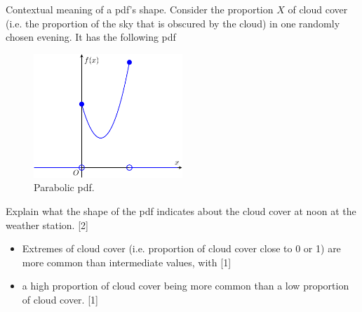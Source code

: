 \begin{example}{Contextual meaning of a pdf's shape.}{}
  Consider the proportion \(X\) of cloud cover (i.e. the proportion of the sky that is obscured by the cloud) in one randomly chosen evening. It has the following pdf
  \begin{figure}[H]
    \centering
    \includegraphics[width=0.5\textwidth]{../Diagrams/Parabolic-probability-density-function/parabolic-pdf.pdf}
    \caption{Parabolic pdf.}
    \label{fig:parabolic-pdf}
  \end{figure}
  Explain what the shape of the pdf indicates about the cloud cover at noon at the weather station. \hspace*{\fill} [2]
  \begin{itemize}
    \item Extremes of cloud cover (i.e. proportion of cloud cover close to 0 or 1) are more common than intermediate values, with \hspace*{\fill} [1]
    \item a high proportion of cloud cover being more common than a low proportion of cloud cover. \hspace*{\fill} [1]
  \end{itemize}
\end{example}